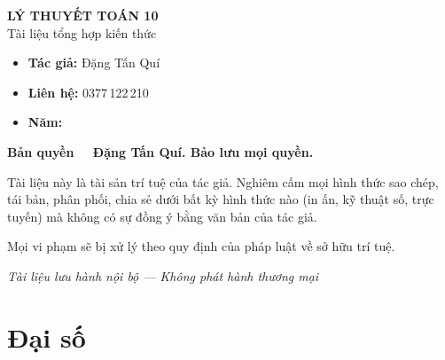 \documentclass[12pt,a4paper]{article}
\begin{document}
\newpage

\thispagestyle{empty}
\vspace*{5cm}
\begin{center}
  {\Large\bfseries LÝ THUYẾT TOÁN 10}\\[8pt]
  {\large Tài liệu tổng hợp kiến thức}
\end{center}

\vspace{2cm}

\begin{tcolorbox}[
  enhanced, colback=red!3!white, colframe=red!60!black,
  fonttitle=\bfseries, title={Thông tin bản quyền},
  boxrule=1.5pt
]
  \begin{itemize}[leftmargin=*]
    \item \textbf{Tác giả:} Đặng Tấn Quí
    \item \textbf{Liên hệ:} 0377\,122\,210
    \item \textbf{Năm:} \the\year
  \end{itemize}

  \vspace{8pt}
  \textbf{Bản quyền \textcopyright\ \the\year\ Đặng Tấn Quí. Bảo lưu mọi quyền.}

  \vspace{6pt}
  Tài liệu này là tài sản trí tuệ của tác giả. Nghiêm cấm mọi hình thức sao chép, tái bản, phân phối, chia sẻ dưới bất kỳ hình thức nào (in ấn, kỹ thuật số, trực tuyến) mà không có sự đồng ý bằng văn bản của tác giả.

  \vspace{6pt}
  Mọi vi phạm sẽ bị xử lý theo quy định của pháp luật về sở hữu trí tuệ.
\end{tcolorbox}

\vfill
\begin{center}
  \small\textit{Tài liệu lưu hành nội bộ --- Không phát hành thương mại}
\end{center}

\newpage

\tableofcontents
\newpage

\section{Đại số}
\end{document}
